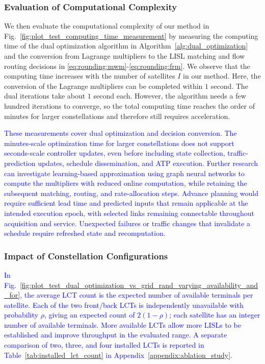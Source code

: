 \documentclass[journal]{IEEEtran}
\newcommand{\blue}[1]{\textcolor{blue}{#1}}
\begin{document}
\subsubsection{Evaluation of Computational Complexity}
We then evaluate the computational complexity of our method in Fig.~\ref{fig:plot_test_computing_time_measurement} by measuring the computing time of the dual optimization algorithm in Algorithm~\ref{alg:dual_optimization} and the conversion from Lagrange multipliers to the LISL matching and flow routing decisions in \eqref{eq:rounding:mwm}-\eqref{eq:rounding:frm}.
We observe that the computing time increases with the number of satellites $I$ in our method. Here, the conversion of the Lagrange multipliers can be completed within $1$ second.
The dual iterations take about $1$ second each. However, the algorithm needs a few hundred iterations to converge, so the total computing time reaches the order of minutes for larger constellations and therefore still requires acceleration.

\blue{These measurements cover dual optimization and decision conversion. The minutes-scale optimization time for larger constellations does not support seconds-scale controller updates, even before including state collection, traffic-prediction updates, schedule dissemination, and ATP execution. Further research can investigate learning-based approximation using graph neural networks to compute the multipliers with reduced online computation, while retaining the subsequent matching, routing, and rate-allocation steps. Advance planning would require sufficient lead time and predicted inputs that remain applicable at the intended execution epoch, with selected links remaining connectable throughout acquisition and service. Unexpected failures or traffic changes that invalidate a schedule require refreshed state and recomputation.}


\subsubsection{Impact of Constellation Configurations}
\blue{In Fig.~\ref{fig:plot_test_dual_optimization_vs_grid_rand_varying_availability_and_for}, the average LCT count is the expected number of available terminals per satellite.
Each of the two front/back LCTs is independently unavailable with probability $\rho$, giving an expected count of $2(1-\rho)$; each satellite has an integer number of available terminals. More available LCTs allow more LISLs to be established and improve throughput in the evaluated range.
A separate comparison of two, three, and four installed LCTs is reported in Table~\ref{tab:installed_lct_count} in Appendix~\ref{appendix:ablation_study}.}
\end{document}

